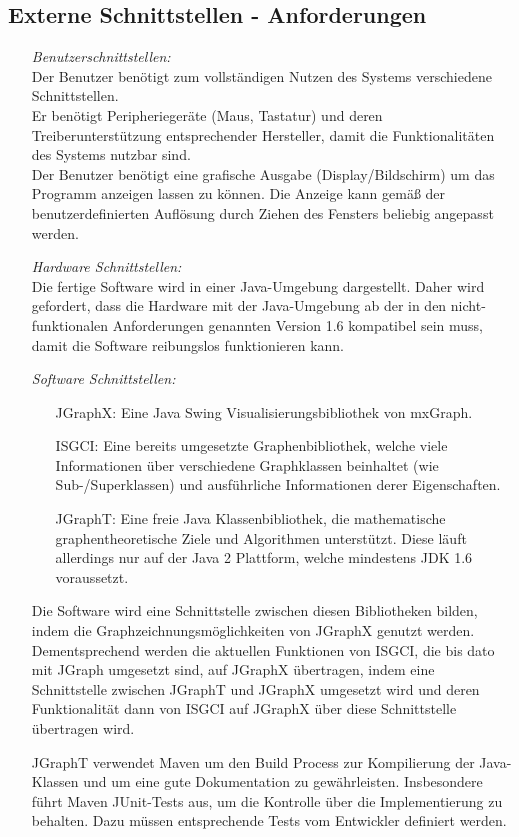 \documentclass[10pt,a4paper]{article}
\begin{document}
	\subsection{Externe Schnittstellen - Anforderungen} %
	\begin{itemize}
	\item[] \textit{Benutzerschnittstellen:}\\
	Der Benutzer benötigt zum vollständigen Nutzen des Systems verschiedene Schnittstellen.\\
	Er benötigt Peripheriegeräte (Maus, Tastatur) und deren Treiberunterstützung entsprechender Hersteller, damit die Funktionalitäten des Systems nutzbar sind.\\
	Der Benutzer benötigt eine grafische Ausgabe (Display/Bildschirm) um das Programm anzeigen lassen zu können. Die Anzeige kann gemäß der benutzerdefinierten Auflösung durch Ziehen des Fensters beliebig angepasst werden.
	\item[] \textit{Hardware Schnittstellen:}\\
	Die fertige Software wird in einer Java-Umgebung dargestellt. Daher wird gefordert, dass die Hardware mit der Java-Umgebung ab der in den nicht-funktionalen Anforderungen genannten Version 1.6 kompatibel sein muss, damit die Software reibungslos funktionieren kann.
	\item[] \textit{Software Schnittstellen:}
	\begin{itemize}
	\item[JGraphX:] Eine Java Swing Visualisierungsbibliothek von mxGraph. 
	\item[ISGCI:] Eine bereits umgesetzte Graphenbibliothek, welche viele Informationen über verschiedene Graphklassen beinhaltet (wie Sub-/Superklassen) und ausführliche Informationen derer Eigenschaften.
	\item[JGraphT:] Eine freie Java Klassenbibliothek, die mathematische graphentheoretische Ziele und Algorithmen unterstützt. Diese läuft allerdings nur auf der Java 2 Plattform, welche mindestens JDK 1.6 voraussetzt.
 	\end{itemize}
	Die Software wird eine Schnittstelle zwischen diesen %
Bibliotheken bilden, indem die \newline Graphzeichnungsmöglichkeiten von JGraphX genutzt werden. Dementsprechend werden die aktuellen Funktionen von ISGCI, die bis dato mit JGraph umgesetzt sind, auf JGraphX übertragen, indem eine Schnittstelle zwischen JGraphT und JGraphX umgesetzt wird und deren Funktionalität dann von ISGCI auf JGraphX über diese Schnittstelle übertragen wird. 
	
	JGraphT verwendet Maven um den Build Process zur Kompilierung der Java-Klassen und um eine gute Dokumentation zu gewährleisten. Insbesondere führt Maven JUnit-Tests aus, um die Kontrolle über die Implementierung zu behalten. Dazu müssen entsprechende Tests vom Entwickler definiert werden.
	\end{itemize}
	
\end{document}
